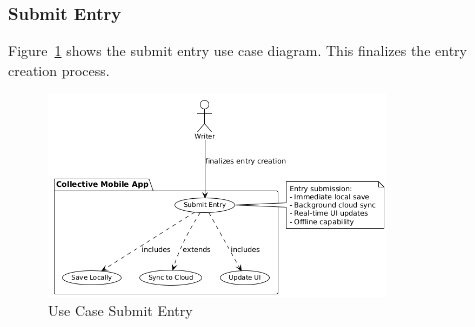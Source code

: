 \subsubsection{Submit Entry}

Figure~\ref{fig:usecase-submit-entry} shows the submit entry use case diagram. This finalizes the entry creation process.

\begin{figure}[H]
\centering
\includegraphics[width=0.8\textwidth]{files/imgs/usecase_U9ojaa5Fmp.png}
\caption{Use Case Submit Entry}
\label{fig:usecase-submit-entry}
\end{figure}

